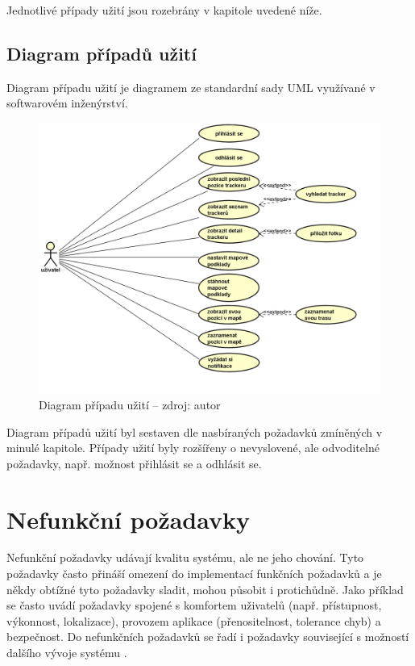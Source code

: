 Jednotlivé případy užití jsou rozebrány v kapitole uvedené níže.

\subsection{Diagram případů užití}

Diagram případu užití je diagramem ze standardní sady UML využívané v softwarovém inženýrství.

\begin{figure}[H]
	\begin{center}
		\includegraphics[width=140mm]{img/usecase.png}
	\end{center}
	\caption[Diagram případu užití]{Diagram případu užití -- zdroj: autor}
\end{figure}

Diagram případů užití byl sestaven dle nasbíraných požadavků zmíněných v minulé kapitole. Případy užití byly rozšířeny o nevyslovené, ale odvoditelné požadavky, např. možnost přihlásit se a odhlásit se.

\section{Nefunkční požadavky}

Nefunkční požadavky udávají kvalitu systému, ale ne jeho chování. Tyto požadavky často přináší omezení do implementací funkčních požadavků a je někdy obtížné tyto požadavky sladit, mohou působit i protichůdně. Jako příklad se často uvádí požadavky spojené s komfortem uživatelů (např. přístupnost, výkonnost, lokalizace), provozem aplikace (přenositelnost, tolerance chyb) a bezpečnost. Do nefunkčních požadavků se řadí i požadavky související s možností dalšího vývoje systému \cite{chung2012non}.

